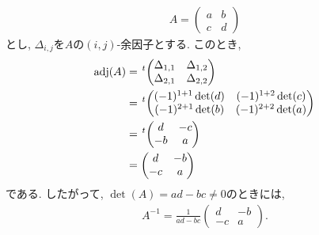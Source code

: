 \begin{example}
  \begin{align*}
    A=\begin{pmatrix}a&b\\c&d\end{pmatrix}
  \end{align*}
  とし,
  $\Delta_{i,j}$を$A$の$(i,j)$-余因子とする.
  このとき,
  \begin{align*}
    \operatorname{adj}(A)
    &={\left.^{t}\!
      \begin{pmatrix}
        \Delta_{1,1}&\Delta_{1,2}\\
        \Delta_{2,1}&\Delta_{2,2}
      \end{pmatrix}\right.}\\
    &={\left.^{t}\!
      \begin{pmatrix}
        (-1)^{1+1}\det(d)&(-1)^{1+2}\det(c)\\
        (-1)^{2+1}\det(b)&(-1)^{2+2}\det(a)
      \end{pmatrix}\right.}\\
    &={\left.^{t}\!
      \begin{pmatrix}
        d&-c\\
        -b&a
      \end{pmatrix}\right.}\\
    &=
      \begin{pmatrix}
        d&-b\\
        -c&a
      \end{pmatrix}
  \end{align*}
  である. したがって, $\det(A)=ad-bc\neq 0$のときには,
  \begin{align*}
    A^{-1}=\frac{1}{ad-bc}
    \begin{pmatrix}
        d&-b\\
        -c&a
      \end{pmatrix}.
  \end{align*}
\end{example}


